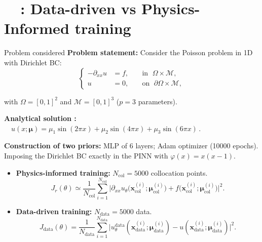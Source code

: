 

\section{\appendixname~\theappendixframenumber~: Data-driven vs Physics-Informed training}

\begin{frame}{Problem considered}
	\textbf{Problem statement:} Consider the Poisson problem in 1D with Dirichlet BC:
	\vspace{-5pt}
	\begin{equation*}
		\left\{
		\begin{aligned}
			-\partial_{xx} u & = f, \; &  & \text{in } \; \Omega \times \mathcal{M}, \\
			u         & = 0, \;  &  & \text{on } \; \partial\Omega \times \mathcal{M},
		\end{aligned}
		\right.
	\end{equation*}

	\vspace{-5pt}
	with $\Omega=[0,1]^2$ and $\mathcal{M}=[0,1]^3$ ($p=3$ parameters).
		
	\vspace{4pt}
	\textbf{Analytical solution :} $\quad u(x;\bm{\mu})=\mu_1\sin(2\pi x)+\mu_2\sin(4\pi x)+\mu_3\sin(6\pi x) \,.$

	\vspace{4pt}
	\textbf{Construction of two priors:} MLP of 6 layers; Adam optimizer (10000 epochs). \\
	Imposing the Dirichlet BC exactly in the PINN with $\varphi(x)=x(x-1)$.

	\begin{itemize}
		\item \textbf{Physics-informed training:} $N_\text{col}=5000$ collocation points.
		$$J_r(\theta) \simeq
			\frac{1}{N_\text{col}} \sum_{i=1}^{N_\text{col}} \big| \partial_{xx}u_\theta(\bm{x}_\text{col}^{(i)};\bm{\mu}_\text{col}^{(i)}\big) + f\big(\bm{x}_\text{col}^{(i)};\bm{\mu}_\text{col}^{(i)}\big) \big|^2.$$
	
		\item \textbf{Data-driven training:}  $N_\text{data}=5000$ data.
		$$J_\text{data}(\theta) =
		\frac{1}{N_\text{data}}
		\sum_{i=1}^{N_\text{data}} \big| u_\theta^\text{data}(\bm{x}_\text{data}^{(i)};\bm{\mu}_\text{data}^{(i)}) - u(\bm{x}_\text{data}^{(i)};\bm{\mu}_\text{data}^{(i)}) \big|^2.$$
	\end{itemize}
\end{frame}

